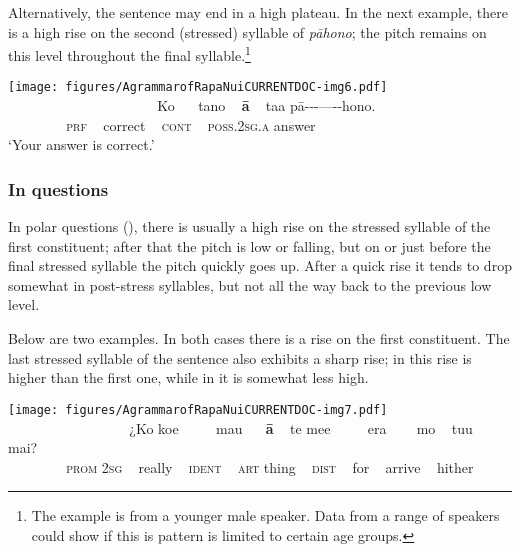 Alternatively, the sentence may end in a high plateau. In the next example, there is a high rise on the second (stressed) syllable of \textit{pāhono}; the pitch remains on this level throughout the final syllable.\footnote{\label{fn:60}The example is from a younger male speaker. Data from a range of speakers could show if this is pattern is limited to certain age groups.} 

 
\ea\label{ex:2.9}
\texttt{[image: figures/AgrammarofRapaNuiCURRENTDOC-img6.pdf]}\\
\gll ~ ~ ~ ~ ~~~~~~~~~~~~~~ Ko ~~ tano ~ \textbf{{\ꞌ}ā} ~ ta{\ꞌ}a  pā\nobreakdash-\nobreakdash-\nobreakdash-\nobreakdash---\nobreakdash-\nobreakdash-hono.\\
 ~ ~ ~ ~ ~ \textsc{prf} ~ correct ~ \textsc{cont} ~ \textsc{poss.2sg.a}  answer\\

\glt 
‘Your answer is correct.’ \textstyleExampleref{[R630-07.015]}
\z

\subsubsection{In questions}\label{sec:2.4.2.2}

In polar questions (), there is usually a high rise on the stressed syllable of the first constituent; after that the pitch is low or falling, but on or just before the final stressed syllable the pitch quickly goes up. After a quick rise it tends to drop somewhat in post-stress syllables, but not all the way back to the previous low level. 

Below are two examples. In both cases there is a rise on the first constituent. The last stressed syllable of the sentence also exhibits a sharp rise; in  this rise is higher than the first one, while in  it is somewhat less high. 

 
\ea\label{ex:2.10}
\texttt{[image: figures/AgrammarofRapaNuiCURRENTDOC-img7.pdf]}\\
\gll ~ ~ ~ ~ ~~~~~~~~~~ ¿Ko koe ~~~~ mau ~~ \textbf{{\ꞌ}ā} ~ te  me{\ꞌ}e ~~~~ era ~~~ mo ~ tu{\ꞌ}u ~ mai? \\
 ~ ~ ~ ~ ~ \textsc{prom} \textsc{2sg} ~ really ~ \textsc{ident} ~ \textsc{art}  thing ~ \textsc{dist} ~ for ~ arrive ~ hither \\

